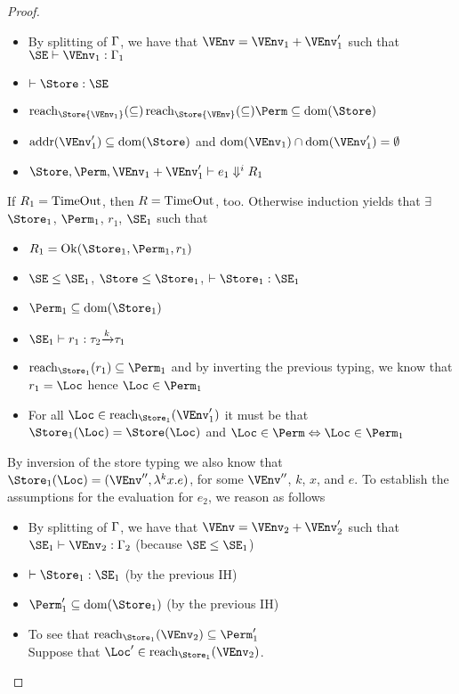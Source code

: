 \begin{proof}
  \begin{itemize}
  \item By splitting of $\Gamma$, we have that $\VEnv = \VEnv_1 +
    \VEnv_1'$ such that  $\SE \vdash \VEnv_1 : \E_1$
  \item $\vdash \Store : \SE$
  \item $\Reach\Store{\VEnv_1} \subseteq \Reach\Store{\VEnv} \subseteq
    \Perm \subseteq \Dom\Store$ 
  \item $\Addresses{\VEnv_1'} \subseteq \Dom\Store$ and
    $\Dom{\VEnv_1} \cap \Dom{\VEnv_1'}=\emptyset$
  \item $\Store, \Perm, \VEnv_1 + \VEnv_1' \vdash {e_1}
    \Downarrow^i R_1$
  \end{itemize}
  If $R_1 = \operatorname{TimeOut}$, then $R = \operatorname{TimeOut}$, too.
  Otherwise induction yields that
  $\exists$ $\Store_1$, $\Perm_1$, $r_1$, $\SE_1$ such that
  \begin{itemize}
  \item
    $R_1 = \Ok{\Store_1, \Perm_1, r_1}$  
  \item $\SE \le \SE_1$, $\Store \le \Store_1$,
    $\vdash \Store_1 : \SE_1$ 
  \item $\Perm_1 \subseteq \Dom{\Store_1}$
  \item $\SE_1 \vdash r_1 : \tau_2\tarr{k}\tau_1$
  \item $\Reach{\Store_1}{r_1} \subseteq \Perm_1$ and by inverting the
    previous typing, we 
    know that $r_1 = \Loc$ hence $\Loc \in \Perm_1$ 
  \item For all $\Loc \in \Reach{\Store_1}{\VEnv_1'}$ it
    must be that $\Store_1 (\Loc) = \Store (\Loc)$ and
    $\Loc\in\Perm \Leftrightarrow \Loc\in\Perm_1$
  \end{itemize}
  By inversion of the store typing we also know that $\Store_1 (\Loc)
  = (\VEnv'',\lam[k]{x}{e})$, for some $\VEnv''$, $k$, $x$, and
  $e$.
  To establish the assumptions for the evaluation for $e_2$, we reason
  as follows
  \begin{itemize}
  \item By splitting of $\Gamma$, we have that $\VEnv = \VEnv_2 +
    \VEnv_2'$ such that  $\SE_1 \vdash \VEnv_2 : \E_2$ (because $\SE\le\SE_1$)
  \item $\vdash \Store_1 : \SE_1$ (by the previous IH)
  \item $\Perm_1' \subseteq \Dom{\Store_1}$ (by the previous IH)
  \item To see that
    $\Reach{\Store_1}{\VEnv_2} \subseteq \Perm_1'$ \\
    Suppose that $\Loc' \in \Reach{\Store_1}{\VEnv_2}$.

\end{itemize}
\end{proof}
